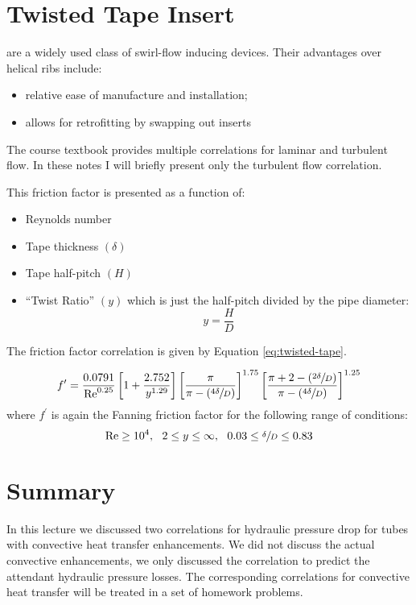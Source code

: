 \section{Twisted Tape Insert} 
 are a widely used class of swirl-flow inducing devices.  Their advantages over helical ribs include:
\begin{itemize}
\item relative ease of manufacture and installation;
\item allows for retrofitting by swapping out inserts
\end{itemize}
The course textbook provides multiple correlations for laminar and turbulent flow.  In these notes I will briefly present only the turbulent flow correlation.\cite{manglik1993heat}

This friction factor is presented as a function of:

\begin{itemize}
\item Reynolds number
\item Tape thickness $(\delta)$
\item Tape half-pitch $(H)$
\item ``Twist Ratio'' $(y)$ which is just the half-pitch divided by the pipe diameter:
$$y = \frac{H}{D}$$
\end{itemize}

The friction factor correlation is given by Equation \ref{eq:twisted-tape}.

\begin{equation}
f^{\prime}=\frac{0.0791}{\text{Re}^{0.25}}\left[1+\frac{2.752}{y^{1.29}} \right]\left[\frac{\pi}{\pi - \left(\sfrac{4 \delta}{D} \right)} \right]^{1.75} \left[\frac{\pi +2 - \left(\sfrac{2\delta}{D} \right)}{\pi - \left(\sfrac{4 \delta}{D} \right)} \right]^{1.25}
\label{eq:twisted-tape}
\end{equation}
where $f^{\prime}$ is again the Fanning friction factor for the following range of conditions:
$$ \text{Re} \ge 10^4, \ \ 2 \le y \le \infty, \ \ 0.03 \le \sfrac{\delta}{D} \le 0.83$$

\section{Summary}
In this lecture we discussed two correlations for hydraulic pressure drop for tubes with convective heat transfer enhancements.  We did not discuss the actual convective enhancements, we only discussed the correlation to predict the attendant hydraulic pressure losses.  The corresponding correlations for convective heat transfer will be treated in a set of homework problems.
